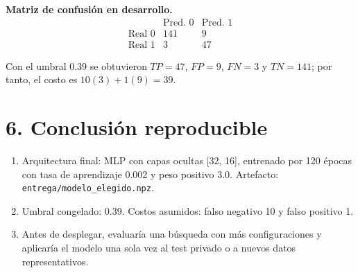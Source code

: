 \documentclass[10pt]{article}
\begin{document}
\textbf{Matriz de confusión en desarrollo.}
\[
\begin{array}{c|cc}
 & \text{Pred. 0} & \text{Pred. 1}\\ \hline
\text{Real 0} & 141 & 9\\
\text{Real 1} & 3 & 47
\end{array}
\]

Con el umbral 0.39 se obtuvieron $TP=47$, $FP=9$, $FN=3$ y $TN=141$; por tanto, el costo es $10(3)+1(9)=39$.

\section*{6. Conclusión reproducible}
\begin{enumerate}
\item Arquitectura final: MLP con capas ocultas [32, 16], entrenado por 120 épocas con tasa de aprendizaje 0.002 y peso positivo 3.0. Artefacto: \texttt{entrega/modelo\_elegido.npz}.
\item Umbral congelado: 0.39. Costos asumidos: falso negativo 10 y falso positivo 1.
\item Antes de desplegar, evaluaría una búsqueda con más configuraciones y aplicaría el modelo una sola vez al test privado o a nuevos datos representativos.
\end{enumerate}
\end{document}
